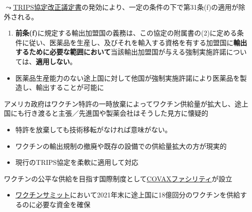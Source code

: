 \documentclass[
  xelatex,
  ja=standard]{bxjsarticle}
\providecommand{\tightlist}{%
  \setlength{\itemsep}{0pt}\setlength{\parskip}{0pt}}\usepackage{longtable,booktabs,array}
\begin{document}
\(\leadsto\)\href{https://www.mofa.go.jp/mofaj/gaiko/treaty/treaty166_11_gai.html}{TRIPS協定改正議定書}の発効により、一定の条件の下で第31条(f)の適用が除外される。

\begin{tcolorbox}[enhanced jigsaw, left=2mm, colframe=quarto-callout-note-color-frame, colback=white, coltitle=black, rightrule=.15mm, title=\textcolor{quarto-callout-note-color}{\faInfo}\hspace{0.5em}{\href{https://www.jpo.go.jp/system/laws/gaikoku/trips/index.html}{TRIPS協定}　第31条の2}, arc=.35mm, toprule=.15mm, bottomrule=.15mm, leftrule=.75mm, bottomtitle=1mm, toptitle=1mm, titlerule=0mm, breakable, opacitybacktitle=0.6, colbacktitle=quarto-callout-note-color!10!white, opacityback=0]

\begin{enumerate}
\def\labelenumi{\arabic{enumi}.}
\tightlist
\item
  \textbf{前条(f)}に規定する輸出加盟国の義務は、この協定の附属書の(2)に定める条件に従い、医薬品を生産し、及びそれを輸入する資格を有する加盟国に\textbf{輸出するために必要な範囲において}当該輸出加盟国が与える強制実施許諾については、\textbf{適用しない}。
\end{enumerate}

\end{tcolorbox}

\begin{itemize}
\tightlist
\item
  医薬品生産能力のない途上国に対して他国が強制実施許諾により医薬品を製造し、輸出することが可能に
\end{itemize}

アメリカ政府はワクチン特許の一時放棄によってワクチン供給量が拡大し、途上国にも行き渡ると主張／先進国や製薬会社はそうした見方に懐疑的

\begin{itemize}
\tightlist
\item
  特許を放棄しても技術移転がなければ意味がない。
\item
  ワクチンの輸出規制の撤廃や既存の設備での供給量拡大の方が現実的
\item
  現行のTRIPS協定を柔軟に適用して対応
\end{itemize}

ワクチンの公平な供給を目指す国際制度として\href{https://www.mhlw.go.jp/content/10501000/000672596.pdf}{COVAXファシリティ}が設立

\begin{itemize}
\tightlist
\item
  \href{https://www.mofa.go.jp/mofaj/page1_000979.html}{ワクチンサミット}において2021年末に途上国に18億回分のワクチンを供給するのに必要な資金を確保
\end{itemize}
\end{document}
